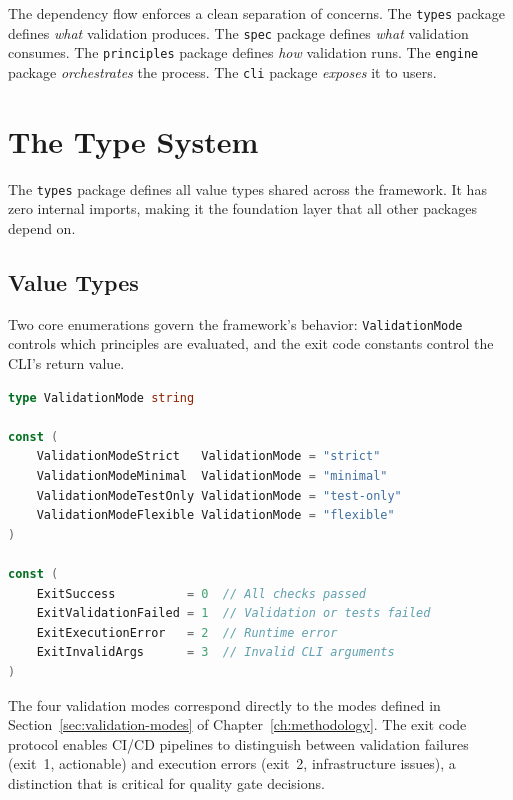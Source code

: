 The dependency flow enforces a clean separation of concerns. The \texttt{types} package defines \textit{what} validation produces. The \texttt{spec} package defines \textit{what} validation consumes. The \texttt{principles} package defines \textit{how} validation runs. The \texttt{engine} package \textit{orchestrates} the process. The \texttt{cli} package \textit{exposes} it to users.

\section{The Type System}
\label{sec:type-system}

The \texttt{types} package defines all value types shared across the framework. It has zero internal imports, making it the foundation layer that all other packages depend on.

\subsection{Value Types}
\label{subsec:value-types}

Two core enumerations govern the framework's behavior: \texttt{ValidationMode} controls which principles are evaluated, and the exit code constants control the CLI's return value.

\begin{lstlisting}[language=Go,caption={ValidationMode and exit code definitions (\texttt{types/modes.go}).},label={lst:modes}]
type ValidationMode string

const (
    ValidationModeStrict   ValidationMode = "strict"
    ValidationModeMinimal  ValidationMode = "minimal"
    ValidationModeTestOnly ValidationMode = "test-only"
    ValidationModeFlexible ValidationMode = "flexible"
)

const (
    ExitSuccess          = 0  // All checks passed
    ExitValidationFailed = 1  // Validation or tests failed
    ExitExecutionError   = 2  // Runtime error
    ExitInvalidArgs      = 3  // Invalid CLI arguments
)
\end{lstlisting}

The four validation modes correspond directly to the modes defined in Section~\ref{sec:validation-modes} of Chapter~\ref{ch:methodology}. The exit code protocol enables CI/CD pipelines to distinguish between validation failures (exit~1, actionable) and execution errors (exit~2, infrastructure issues), a distinction that is critical for quality gate decisions.

